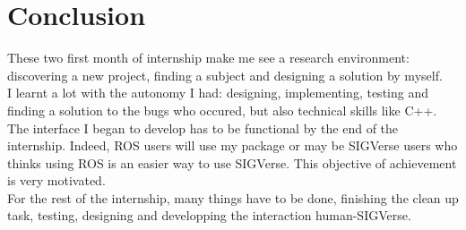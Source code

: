 \chapter{Conclusion}
\setlength{\parskip}{2.5ex plus .4ex minus .4ex}
These two first month of internship make me see a research environment: discovering a new project, finding a subject and designing a solution by myself.\\
I learnt a lot with the autonomy I had: designing, implementing, testing and finding a solution to the bugs who occured, but also technical skills like C++.\\

The interface I began to develop has to be functional by the end of the internship. Indeed, ROS users will use my package or may be SIGVerse users who thinks using ROS is an easier way to use SIGVerse. This objective of achievement is very motivated.\\

For the rest of the internship, many things have to be done, finishing the clean up task, testing, designing and developping the interaction human-SIGVerse.

%
